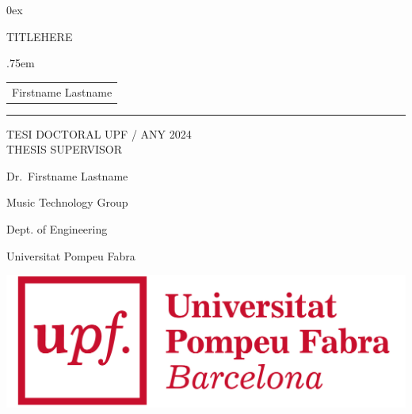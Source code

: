 \documentclass[11pt,a4paper,twoside,openright, showtrims, oldfontcommands]{memoir}
\begin{document}
\parindent0ex




\frontmatter

\newpage
\thispagestyle{empty}
\begin{titlingpage}
\begin{flushright}
  \begin{flushleft}%
    {\LARGE \sffamily TITLEHERE \par}%
    \vskip 2cm%
    {\large
     \lineskip .75em%
      \begin{tabular}[t]{c}%
       {\Huge  {Firstname Lastname}}
      \end{tabular}\par}%
      \rule{\linewidth}{1mm} \par
    {\large TESI DOCTORAL UPF / ANY 2024}\\[2cm]
    {\normalsize THESIS SUPERVISOR}\par
    {\large Dr.~Firstname Lastname}\par
    {\large Music Technology Group}\par
    {\large Dept. of Engineering} \par
    {\large Universitat Pompeu Fabra} \par

    \vspace{7cm}
   \centering  
    \includegraphics[scale=0.08]{logo_upf_color.png}
   \end{flushleft}\par
   
   \end{flushright}
\end{titlingpage}
\end{document}
